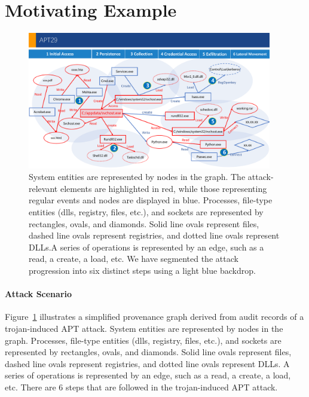 \section{Motivating Example}
\label{sec:motivation}

\begin{figure}[ht]
    \centering
    \includegraphics[width=0.95\textwidth]{figs/example.pdf}
    \caption{ 
    System entities are represented by nodes in the graph. 
    The attack-relevant elements are highlighted in red, while those representing regular events and nodes are displayed in blue.
    Processes, file-type entities (dlls, registry, files, etc.), and sockets are represented by rectangles, ovals, and diamonds. Solid line ovals represent files, dashed line ovals represent registries, and dotted line ovals represent DLLs.A series of operations is represented by an edge, such as a read, a create, a load, etc. We have segmented the attack progression into six distinct steps using a light blue backdrop. }
    \label{fig-example}
    \end{figure}

\paragraph{Attack Scenario}
Figure~\ref{fig-example} illustrates a simplified provenance graph derived from audit records of a trojan-induced APT attack. System entities are represented by nodes in the graph. 
Processes, file-type entities (dlls, registry, files, etc.), and sockets are represented by rectangles, ovals, and diamonds. Solid line ovals represent files, dashed line ovals represent registries, and dotted line ovals represent DLLs.
A series of operations is represented by an edge, such as a read, a create, a load, etc.
There are 6 steps that are followed in the trojan-induced APT attack.


